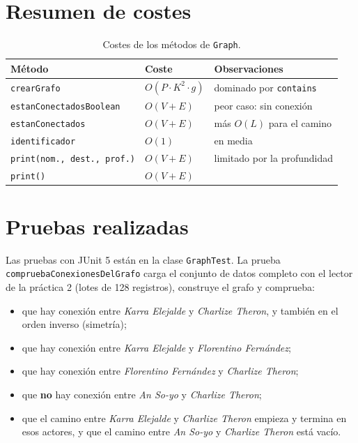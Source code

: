 \documentclass[a4paper,11pt]{report}
\begin{document}
\section{\label{tablaResumen}Resumen de costes}

\begin{table}[ht]
\centering
\begin{tabular}{l l l}
\toprule
Método & Coste & Observaciones \\
\midrule
\texttt{crearGrafo} & $O(P \cdot K^2 \cdot g)$ & dominado por \texttt{contains} \\
\texttt{estanConectadosBoolean} & $O(V+E)$ & peor caso: sin conexión \\
\texttt{estanConectados} & $O(V+E)$ & más $O(L)$ para el camino \\
\texttt{identificador} & $O(1)$ & en media \\
\texttt{print(nom., dest., prof.)} & $O(V+E)$ & limitado por la profundidad \\
\texttt{print()} & $O(V+E)$ & \\
\bottomrule
\end{tabular}
\caption{Costes de los métodos de \texttt{Graph}.}
\end{table}

\section{\label{pruebas}Pruebas realizadas}

Las pruebas con JUnit 5 están en la clase \texttt{GraphTest}. La prueba \texttt{comprueba\allowbreak Conexiones\allowbreak Del\allowbreak Grafo} carga el conjunto de datos completo con el lector de la práctica 2 (lotes de 128 registros), construye el grafo y comprueba:

\begin{itemize}
    \item que hay conexión entre \textit{Karra Elejalde} y \textit{Charlize Theron}, y también en el orden inverso (simetría);
    \item que hay conexión entre \textit{Karra Elejalde} y \textit{Florentino Fernández};
    \item que hay conexión entre \textit{Florentino Fernández} y \textit{Charlize Theron};
    \item que \textbf{no} hay conexión entre \textit{An So-yo} y \textit{Charlize Theron};
    \item que el camino entre \textit{Karra Elejalde} y \textit{Charlize Theron} empieza y termina en esos actores, y que el camino entre \textit{An So-yo} y \textit{Charlize Theron} está vacío.
\end{itemize}
\end{document}
